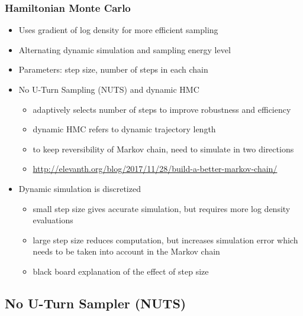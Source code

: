 \documentclass[10pt]{beamer}
\begin{document}
\begin{frame}

\frametitle{Hamiltonian Monte Carlo}

  \begin{itemize}
  \item Uses gradient of log density for more efficient sampling
  \item Alternating dynamic simulation and sampling energy level
  \item<2-> Parameters: step size, number of steps in each chain
  \item<3-> No U-Turn Sampling (NUTS) and dynamic HMC
    \begin{itemize}
    \item adaptively selects number of steps to improve robustness and
      efficiency
    \item dynamic HMC refers to dynamic trajectory length
    \item to keep reversibility of Markov chain, need to simulate in two directions
    \item {\footnotesize \url{http://elevanth.org/blog/2017/11/28/build-a-better-markov-chain/}}
    \end{itemize}
  \item<4-> Dynamic simulation is discretized
    \begin{itemize}
    \item small step size gives accurate simulation, but requires more log density evaluations
    \item large step size reduces computation, but increases
      simulation error which needs to be taken into account in the
      Markov chain
    \item black board explanation of the effect of step size
    \end{itemize}
\end{itemize}

\end{frame}

\subsection{No U-Turn Sampler (NUTS)}
\end{document}
